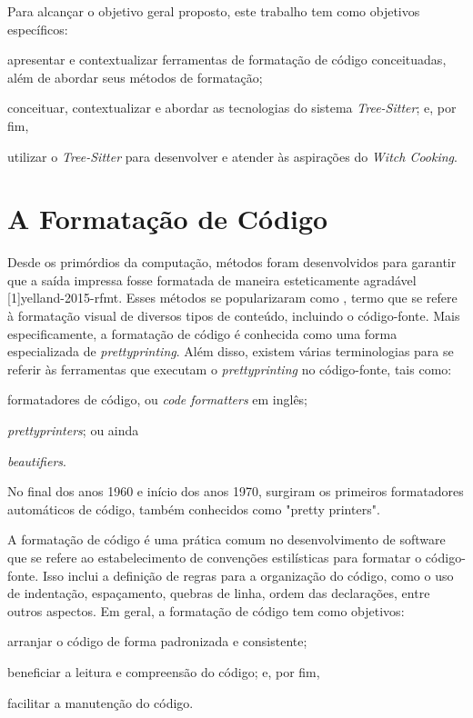 \documentclass[11pt, a4paper, english, openright, twoside, brazil]{abntex2}
\begin{document}
  Para alcançar o objetivo geral proposto, este trabalho tem como objetivos
  específicos:
  \begin{inparaenum}
    \item apresentar e contextualizar ferramentas de formatação de código
          conceituadas, além de abordar seus métodos de formatação;
    \item conceituar, contextualizar e abordar as tecnologias do sistema
          \textit{Tree-Sitter}; e, por fim,
    \item utilizar o \textit{Tree-Sitter} para desenvolver e atender às
          aspirações do \textit{Witch Cooking}.
  \end{inparaenum}


  \chapter{A Formatação de Código}

  Desde os primórdios da computação, métodos foram desenvolvidos para garantir
  que a saída impressa fosse formatada de maneira esteticamente agradável
  [1]{yelland-2015-rfmt}. Esses métodos se
  popularizaram como \textit{}, termo que se refere à
  formatação visual de diversos tipos de conteúdo, incluindo o código-fonte.
  Mais especificamente, a formatação de código é conhecida como uma forma
  especializada de \textit{prettyprinting}. Além disso, existem várias
  terminologias para se referir às ferramentas que executam o
  \textit{prettyprinting} no código-fonte, tais como:
  \begin{inparaenum}
    \item formatadores de código, ou \textit{code formatters} em inglês;
    \item \textit{prettyprinters}; ou ainda
    \item \textit{beautifiers}.
  \end{inparaenum}

  No final dos anos 1960 e início dos anos 1970, surgiram os primeiros
  formatadores automáticos de código, também conhecidos como "pretty printers".

  A formatação de código é uma prática comum no desenvolvimento de software que
  se refere ao estabelecimento de convenções estilísticas para formatar o
  código-fonte. Isso inclui a definição de regras para a organização do código,
  como o uso de indentação, espaçamento, quebras de linha, ordem das
  declarações, entre outros aspectos. Em geral, a formatação de código tem como
  objetivos:
  \begin{inparaenum}
    \item arranjar o código de forma padronizada e consistente;
    \item beneficiar a leitura e compreensão do código; e, por fim,
    \item facilitar a manutenção do código.
  \end{inparaenum}
\end{document}

